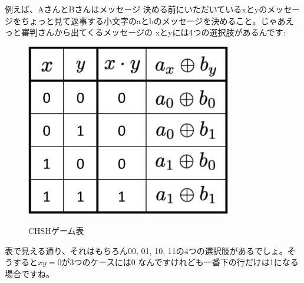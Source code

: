 例えば、AさんとBさんはメッセージ
決める前にいただいているxとyのメッセージをちょっと見て返事する小文字のaとbのメッセージを決めること。じゃあえっと審判さんから出てくるメッセージの
xとyには4つの選択肢があるんです:
\begin{figure}[H]
    \centering
    \includegraphics[width=0.8\textwidth]{lesson4/CHSH_table.pdf}
    \label{fig: 1}
    \begin{center}
        \caption{CHSHゲーム表}
    \end{center}
\end{figure}
表で見える通り、それはもちろん00, 01, 10, 11の4つの選択肢があるでしょ。そうすると$x y = 0$が3つのケースには0
なんですけれども一番下の行だけは1になる場合ですね。

